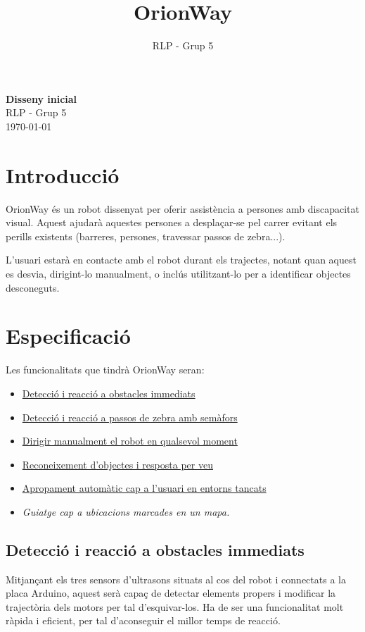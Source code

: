 \documentclass[11pt]{article}
\title{\bfseries\Huge OrionWay}
\author{RLP - Grup 5}
\begin{document}
	
	\begin{center}
		\vspace*{0.25cm}
		{\Huge \bfseries Disseny inicial}\\[0.5cm]
		{\Large RLP - Grup 5}\\[0.25cm]
		\today
	\end{center}
	
	\section*{Introducció}
	OrionWay és un robot dissenyat per oferir assistència a persones amb discapacitat visual. Aquest ajudarà aquestes persones a desplaçar-se pel carrer evitant els perills existents (barreres, persones, travessar passos de zebra...).
	
	L'usuari estarà en contacte amb el robot durant els trajectes, notant quan aquest es desvia, dirigint-lo manualment, o inclús utilitzant-lo per a identificar objectes desconeguts.
	
	\section*{Especificació}
	Les funcionalitats que tindrà OrionWay seran:
	\begin{itemize}
		\item \hyperlink{sec:a}{Detecció i reacció a obstacles immediats}
		\item \hyperlink{sec:b}{Detecció i reacció a passos de zebra amb semàfors}
		\item \hyperlink{sec:c}{Dirigir manualment el robot en qualsevol moment}
		\item \hyperlink{sec:d}{Reconeixement d'objectes i resposta per veu}
		\item \hyperlink{sec:e}{Apropament automàtic cap a l'usuari en entorns tancats}
		\item \textit{Guiatge cap a ubicacions marcades en un mapa.}
	\end{itemize}
	
	\hypertarget{sec:a}{}
	\subsection*{Detecció i reacció a obstacles immediats}
	Mitjançant els tres sensors d'ultrasons situats al cos del robot i connectats a la placa Arduino, aquest serà capaç de detectar elements propers i modificar la trajectòria dels motors per tal d'esquivar-los. Ha de ser una funcionalitat molt ràpida i eficient, per tal d'aconseguir el millor temps de reacció.
	
\end{document}
